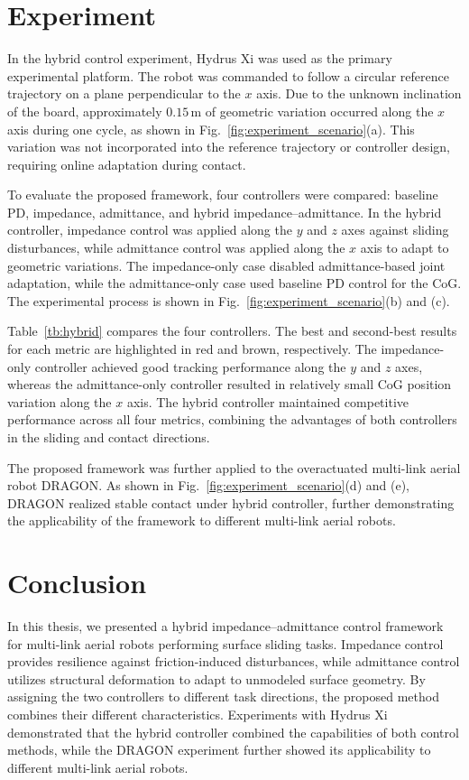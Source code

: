 \documentclass[10pt,a4paper,twocolumn]{article}
\begin{document}
\section{Experiment}
In the hybrid control experiment, Hydrus Xi was used as the primary experimental platform. The robot was commanded to follow a circular reference trajectory on a plane perpendicular to the $x$ axis. Due to the unknown inclination of the board, approximately $0.15\,\mathrm{m}$ of geometric variation occurred along the $x$ axis during one cycle, as shown in Fig.~\ref{fig:experiment_scenario}(a). This variation was not incorporated into the reference trajectory or controller design, requiring online adaptation during contact.

To evaluate the proposed framework, four controllers were compared: baseline PD, impedance, admittance, and hybrid impedance--admittance. In the hybrid controller, impedance control was applied along the $y$ and $z$ axes against sliding disturbances, while admittance control was applied along the $x$ axis to adapt to geometric variations. The impedance-only case disabled admittance-based joint adaptation, while the admittance-only case used baseline PD control for the CoG. The experimental process is shown in Fig.~\ref{fig:experiment_scenario}(b) and (c).

Table~\ref{tb:hybrid} compares the four controllers. The best and second-best results for each metric are highlighted in red and brown, respectively. The impedance-only controller achieved good tracking performance along the $y$ and $z$ axes, whereas the admittance-only controller resulted in relatively small CoG position variation along the $x$ axis. The hybrid controller maintained competitive performance across all four metrics, combining the advantages of both controllers in the sliding and contact directions.

The proposed framework was further applied to the overactuated multi-link aerial robot DRAGON. As shown in Fig.~\ref{fig:experiment_scenario}(d) and (e), DRAGON realized stable contact under hybrid controller, further demonstrating the applicability of the framework to different multi-link aerial robots.

\section{Conclusion}
In this thesis, we presented a hybrid impedance--admittance control framework for multi-link aerial robots performing surface sliding tasks. Impedance control provides resilience against friction-induced disturbances, while admittance control utilizes structural deformation to adapt to unmodeled surface geometry. By assigning the two controllers to different task directions, the proposed method combines their different characteristics. Experiments with Hydrus Xi demonstrated that the hybrid controller combined the capabilities of both control methods, while the DRAGON experiment further showed its applicability to different multi-link aerial robots.
\end{document}
